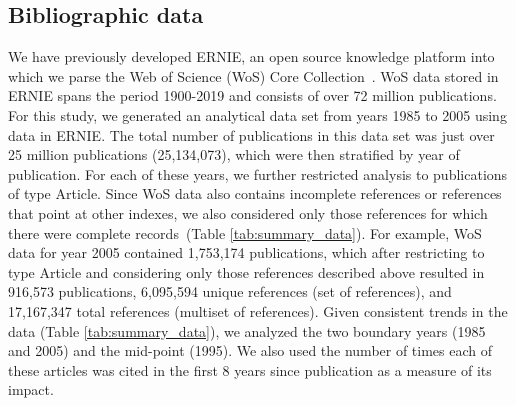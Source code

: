 \documentclass[NETN]{stjour}
\begin{document}
\subsection{Bibliographic data} We have previously developed ERNIE, an open source knowledge platform into which we parse the Web of Science (WoS) Core Collection~\citep{Keserci371955}. WoS data stored in ERNIE spans the period 1900-2019 and consists of over 72 million publications. For this study, we generated an analytical data set from years 1985 to 2005 using data in ERNIE. The total number of publications in this data set was just over 25 million publications (25,134,073), which were then stratified by year of publication. For each of these years, we further restricted analysis to publications of type Article. Since WoS data also contains incomplete references or references that point at other indexes, we also considered only those references for which there were complete records~(Table \ref{tab:summary_data}). For example, WoS data for year 2005 contained 1,753,174 publications, which after restricting to type Article and considering only those references described above resulted in 916,573 publications, 6,095,594 unique references (set of references), and 17,167,347 total references (multiset of references). Given consistent trends in the data (Table \ref{tab:summary_data}), we analyzed the two boundary years (1985 and 2005) and the mid-point (1995). We also used the number of times each of these articles was cited in the first 8 years since publication as a measure of its impact.
\vspace{-4mm}
\end{document}
